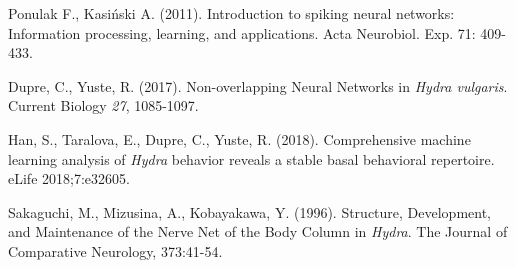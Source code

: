 \documentclass{article}
\begin{document}
\begin{thebibliography}{4}
    Ponulak F., Kasiński A. (2011).
    Introduction to spiking neural networks: Information processing, learning, and applications.
    Acta Neurobiol. Exp. 71: 409-433.
  
    Dupre, C., Yuste, R. (2017). Non-overlapping Neural Networks in \textit{Hydra vulgaris}. Current Biology \textit{27}, 1085-1097.
    
    Han, S., Taralova, E., Dupre, C., Yuste, R. (2018).
    Comprehensive machine learning analysis of \textit{Hydra} behavior reveals a stable basal behavioral repertoire.
    eLife 2018;7:e32605.
    
    Sakaguchi, M., Mizusina, A., Kobayakawa, Y. (1996).
    Structure, Development, and Maintenance of the Nerve Net of the Body Column in \textit{Hydra}.
    The Journal of Comparative Neurology, 373:41-54.
\end{thebibliography}
\end{document}
